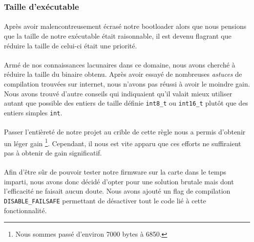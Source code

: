 \subsubsection{Taille d'exécutable}
\paragraph{}
Après avoir malencontreusement écrasé notre bootloader alors que nous pensions
que la taille de notre exécutable était raisonnable, il est devenu flagrant que
réduire la taille de celui-ci était une priorité.

\paragraph{}
Armé de nos connaissances lacunaires dans ce domaine, nous avons cherché à
réduire la taille du binaire obtenu. Après avoir essayé de nombreuses
{\em astuces} de compilation trouvées sur internet, nous n'avons pas réussi à
avoir le moindre gain. Nous avons trouvé d'autre conseils qui indiquaient qu'il
valait mieux utiliser autant que possible des entiers de taille définie
\verb!int8_t! ou \verb!int16_t! plutôt que des entiers simples \verb!int!.

\paragraph{}
Passer l'entièreté de notre projet au crible de cette règle nous a permis
d'obtenir un léger gain
          \footnote{Nous sommes passé d'environ 7000 bytes à 6850.}.
Cependant, il nous est vite apparu que ces efforts ne suffiraient pas à obtenir
de gain significatif.

\paragraph{}
Afin d'être sûr de pouvoir tester notre firmware sur la carte dans le temps
imparti, nous avons donc décidé d'opter pour une solution brutale mais dont
l'efficacité ne faisait aucun doute. Nous avons ajouté un flag de compilation
\verb!DISABLE_FAILSAFE! permettant de désactiver tout le code lié à cette
fonctionnalité.
